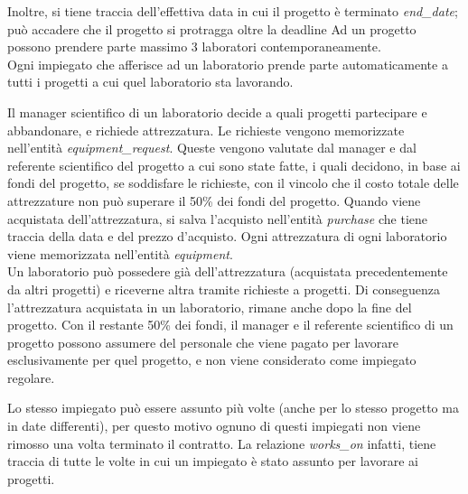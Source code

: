 Inoltre, si tiene traccia dell'effettiva data in cui il progetto è terminato \textit{end\_date}; può accadere che il progetto si protragga oltre la deadline\sskip
Ad un progetto possono prendere parte massimo 3 laboratori contemporaneamente.\\
Ogni impiegato che afferisce ad un laboratorio prende parte automaticamente a tutti i progetti a cui quel laboratorio sta lavorando.

Il manager scientifico di un laboratorio decide a quali progetti partecipare e abbandonare, e richiede attrezzatura.\sskip
Le richieste vengono memorizzate nell'entità \textit{equipment\_request}.
Queste vengono valutate dal manager e dal referente scientifico del progetto a cui sono state fatte, i quali decidono, in base ai fondi del progetto, se soddisfare le richieste, con il vincolo che il costo totale delle attrezzature non può superare il 50\% dei fondi del progetto.\sskip
Quando viene acquistata dell'attrezzatura, si salva l'acquisto nell'entità \textit{purchase} che tiene traccia della data e del prezzo d'acquisto.\sskip
Ogni attrezzatura di ogni laboratorio viene memorizzata nell'entità \textit{equipment}.\\
Un laboratorio può possedere già dell'attrezzatura (acquistata precedentemente da altri progetti) e riceverne altra tramite richieste a progetti. Di conseguenza l'attrezzatura acquistata in un laboratorio, rimane anche dopo la fine del progetto.\sskip
Con il restante 50\% dei fondi, il manager e il referente scientifico di un progetto possono assumere del personale che viene pagato per lavorare esclusivamente per quel progetto, e non viene considerato come impiegato regolare.

Lo stesso impiegato può essere assunto più volte (anche per lo stesso progetto ma in date differenti), per questo motivo ognuno di questi impiegati non viene rimosso una volta terminato il contratto.
La relazione \textit{works\_on} infatti, tiene traccia di tutte le volte in cui un impiegato è stato assunto per lavorare ai progetti.



